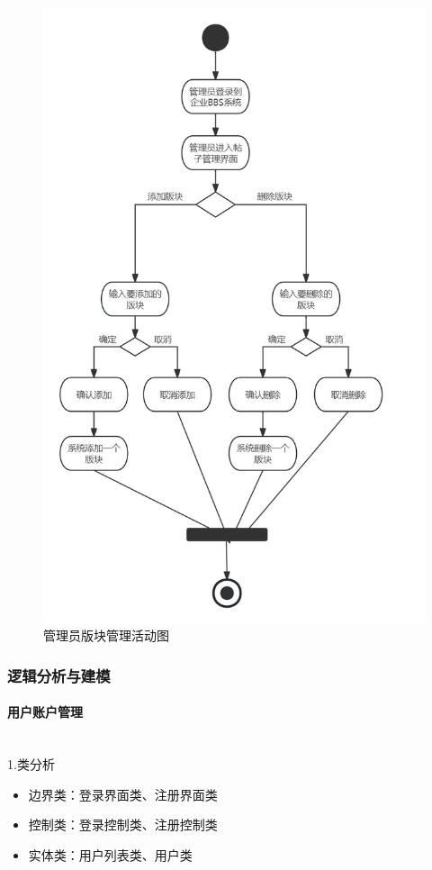 \documentclass[UTF8]{ctexart}
\newcommand{\subsubsubsection}[1]{\paragraph{#1}\mbox{}\\} %
\begin{document}
\begin{figure}[H]
  \centering
  \includegraphics[scale=0.25]{活动图/管理员版块管理活动图.jpg}
  \caption{管理员版块管理活动图}
\end{figure}




\newpage

\subsubsection{逻辑分析与建模}

\subsubsubsection{用户账户管理}

1.类分析
\begin{itemize}
  \item 边界类：登录界面类、注册界面类
  \item 控制类：登录控制类、注册控制类
  \item 实体类：用户列表类、用户类
\end{itemize}
\end{document}
